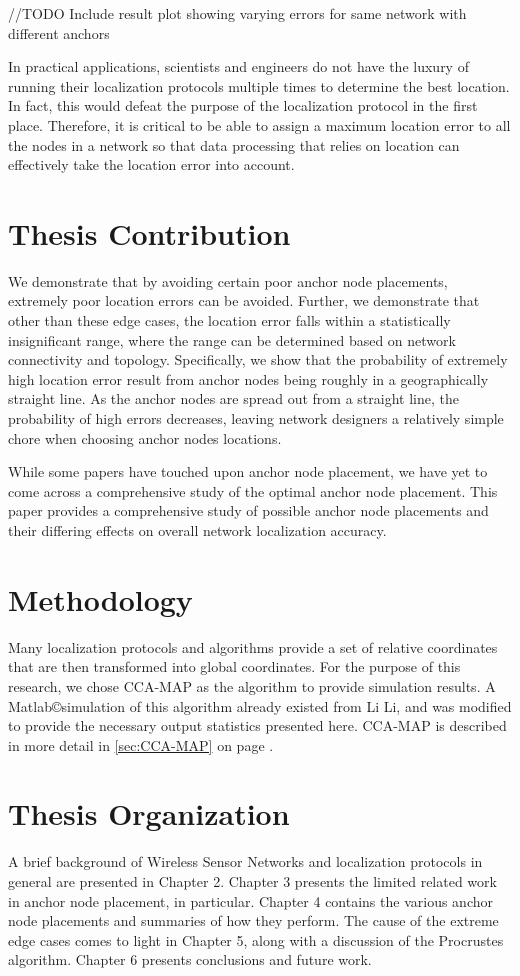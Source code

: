 //TODO Include result plot showing varying errors for same network with different anchors

In practical applications, scientists and engineers do not have the luxury of running their localization protocols multiple times to determine the best location.  In fact, this would defeat the purpose of the localization protocol in the first place.  Therefore, it is critical to be able to assign a maximum location error to all the nodes in a network so that data processing that relies on location can effectively take the location error into account.  

\section{Thesis Contribution}
We demonstrate that by avoiding certain poor anchor node placements, extremely poor location errors can be avoided.  Further, we demonstrate that other than these edge cases, the location error falls within a statistically insignificant range, where the range can be determined based on network connectivity and topology.  Specifically, we show that the probability of extremely high location error result from anchor nodes being roughly in a geographically straight line.  As the anchor nodes are spread out from a straight line, the probability of high errors decreases, leaving network designers a relatively simple chore when choosing anchor nodes locations.

While some papers have touched upon anchor node placement, we have yet to come across a comprehensive study of the optimal anchor node placement.  This paper provides a comprehensive study of possible anchor node placements and their differing effects on overall network localization accuracy.

\section{Methodology}
Many localization protocols and algorithms provide a set of relative coordinates that are then transformed into global coordinates.  For the purpose of this research, we chose CCA-MAP\cite{CCA-MAP07,CCA-MAP09} as the algorithm to provide simulation results.  A Matlab\copyright  simulation of this algorithm already existed from Li Li\cite{CCA-MAP07}, and was modified to provide the necessary output statistics presented here.  CCA-MAP is described in more detail in \ref{sec:CCA-MAP} on page \pageref{sec:CCA-MAP}.

\section{Thesis Organization}
A brief background of Wireless Sensor Networks and localization protocols in general are presented in Chapter 2.  Chapter 3 presents the limited related work in anchor node placement, in particular.  Chapter 4 contains the various anchor node placements and summaries of how they perform.  The cause of the extreme edge cases comes to light in Chapter 5, along with a discussion of the Procrustes algorithm.  Chapter 6 presents conclusions and future work.

